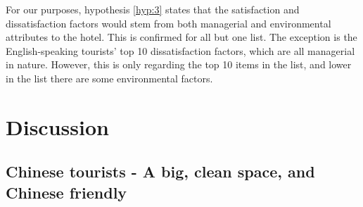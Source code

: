 \documentclass[review]{elsarticle}
\begin{document}
\begin{table}[]
\caption{Managerial and Environmental nature of the most frequently used keywords}
\label{tab:hyp3}
\end{table}

For our purposes, hypothesis \ref{hyp:3} states that the satisfaction and dissatisfaction factors would stem from both managerial and environmental attributes to the hotel. This is confirmed for all but one list. The exception is the English-speaking tourists' top 10 dissatisfaction factors, which are all managerial in nature. However, this is only regarding the top 10 items in the list, and lower in the list there are some environmental factors.

\section{Discussion}\label{discussion}

\subsection{Chinese tourists - A big, clean space, and Chinese friendly}\label{disc:zh}
\end{document}
